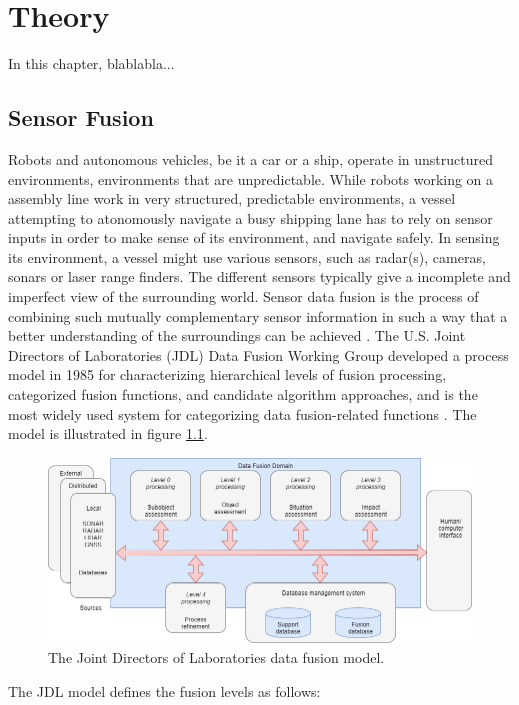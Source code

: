
\chapter{Theory}
In this chapter, blablabla...
\section{Sensor Fusion}
Robots and autonomous vehicles, be it a car or a ship, operate in unstructured environments, environments that are unpredictable. While robots working on a assembly line work in very structured, predictable environments, a vessel attempting to atonomously navigate a busy shipping lane has to rely on sensor inputs in order to make sense of its environment, and navigate safely. In sensing its environment, a vessel might use various sensors, such as radar(s), cameras, sonars or laser range finders. The different sensors typically give a incomplete and imperfect view of the surrounding world. Sensor data fusion is the process of combining such mutually complementary sensor information in such a way that a better understanding of the surroundings can be achieved \cite{sensorFusion1}.
The U.S. Joint Directors of Laboratories (JDL) Data Fusion Working Group developed a process model in 1985 for characterizing hierarchical levels of fusion processing, categorized fusion functions, and candidate algorithm approaches, and is the most widely used system for categorizing data fusion-related functions \cite{JDLFusion}. The model is illustrated in figure \ref{fig:jdl_fusion}.
\begin{figure}[H]
    \centering
    \includegraphics[width=.8\linewidth]{fig/JDLfusion.png}
    \caption{The Joint Directors of Laboratories data fusion model.}
    \label{fig:jdl_fusion}
\end{figure}
The JDL model defines the fusion levels as follows:
